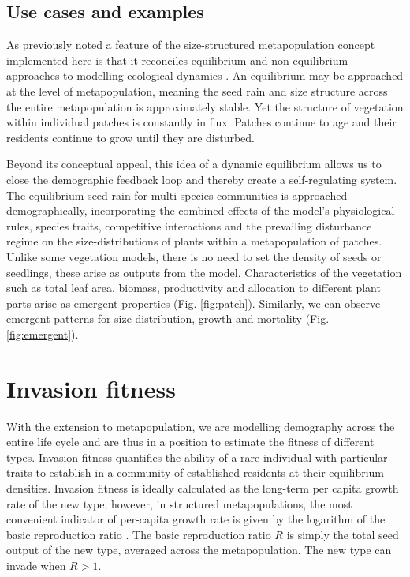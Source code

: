 \documentclass[]{article}
\begin{document}
\subsection{Use cases and examples}\label{use-cases-and-examples-2}

As previously noted \citep{Kohyama-1993, Moorcroft-2001, Falster-2011} a
feature of the size-structured metapopulation concept implemented here
is that it reconciles equilibrium and non-equilibrium approaches to
modelling ecological dynamics
\citep{Levin-1974, Bormann-1979, Connell-1978, Coomes-2007}. An
equilibrium may be approached at the level of metapopulation, meaning
the seed rain and size structure across the entire metapopulation is
approximately stable. Yet the structure of vegetation within individual
patches is constantly in flux. Patches continue to age and their
residents continue to grow until they are disturbed.

Beyond its conceptual appeal, this idea of a dynamic equilibrium allows
us to close the demographic feedback loop and thereby create a
self-regulating system. The equilibrium seed rain for multi-species
communities is approached demographically, incorporating the combined
effects of the model's physiological rules, species traits, competitive
interactions and the prevailing disturbance regime on the
size-distributions of plants within a metapopulation of patches. Unlike
some vegetation models, there is no need to set the density of seeds or
seedlings, these arise as outputs from the model. Characteristics of the
vegetation such as total leaf area, biomass, productivity and allocation
to different plant parts arise as emergent properties (Fig.
\ref{fig:patch}). Similarly, we can observe emergent patterns for
size-distribution, growth and mortality (Fig. \ref{fig:emergent}).

\section{Invasion fitness}\label{invasion-fitness}

With the extension to metapopulation, we are modelling demography across
the entire life cycle and are thus in a position to estimate the fitness
of different types. Invasion fitness quantifies the ability of a rare
individual with particular traits to establish in a community of
established residents at their equilibrium densities. Invasion fitness
is ideally calculated as the long-term per capita growth rate of the new
type; however, in structured metapopulations, the most convenient
indicator of per-capita growth rate is given by the logarithm of the
basic reproduction ratio \citep{Gyllenberg-2001, Metz-2001}. The basic
reproduction ratio \(R\) is simply the total seed output of the new
type, averaged across the metapopulation. The new type can invade when
\(R > 1\).
\end{document}
